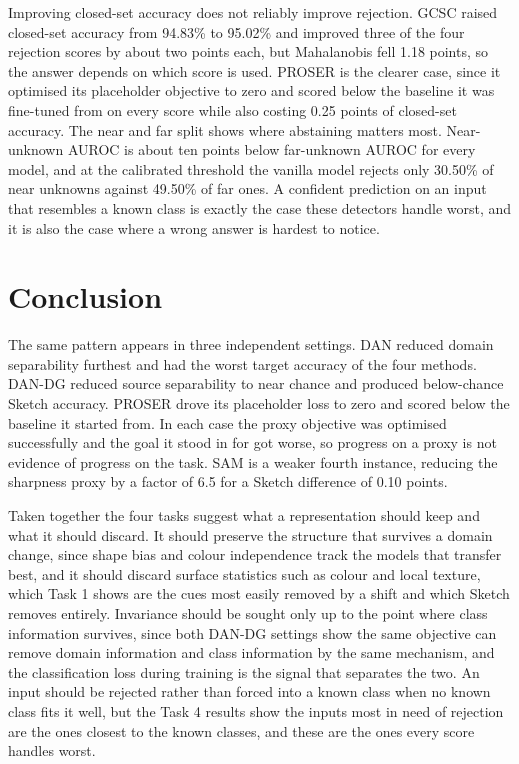 \documentclass{article}
\begin{document}
Improving closed-set accuracy does not reliably improve rejection. GCSC
raised closed-set accuracy from 94.83\% to 95.02\% and improved three of the
four rejection scores by about two points each, but Mahalanobis fell 1.18
points, so the answer depends on which score is used. PROSER is the clearer
case, since it optimised its placeholder objective to zero and scored below
the baseline it was fine-tuned from on every score while also costing 0.25
points of closed-set accuracy. The near and far split shows where abstaining
matters most. Near-unknown AUROC is about ten points below far-unknown AUROC
for every model, and at the calibrated threshold the vanilla model rejects
only 30.50\% of near unknowns against 49.50\% of far ones. A confident
prediction on an input that resembles a known class is exactly the case these
detectors handle worst, and it is also the case where a wrong answer is
hardest to notice.

\section{Conclusion}
\label{sec:conclusion}

The same pattern appears in three independent settings. DAN reduced domain
separability furthest and had the worst target accuracy of the four methods.
DAN-DG reduced source separability to near chance and produced below-chance
Sketch accuracy. PROSER drove its placeholder loss to zero and scored below
the baseline it started from. In each case the proxy objective was optimised
successfully and the goal it stood in for got worse, so progress on a proxy
is not evidence of progress on the task. SAM is a weaker fourth instance,
reducing the sharpness proxy by a factor of 6.5 for a Sketch difference of
0.10 points.

Taken together the four tasks suggest what a representation should keep and
what it should discard. It should preserve the structure that survives a
domain change, since shape bias and colour independence track the models that
transfer best, and it should discard surface statistics such as colour and
local texture, which Task 1 shows are the cues most easily removed by a shift
and which Sketch removes entirely. Invariance should be sought only up to the
point where class information survives, since both DAN-DG settings show the
same objective can remove domain information and class information by the
same mechanism, and the classification loss during training is the signal
that separates the two. An input should be rejected rather than forced into a
known class when no known class fits it well, but the Task 4 results show the
inputs most in need of rejection are the ones closest to the known classes,
and these are the ones every score handles worst.
\end{document}
